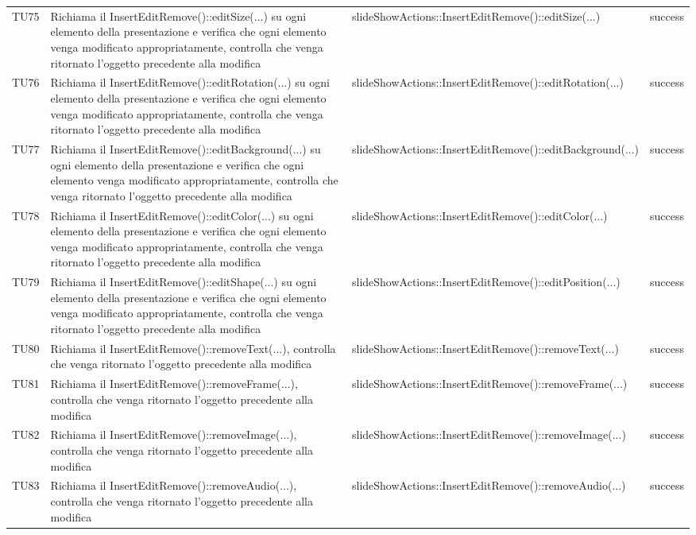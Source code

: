 \begin{longtable} [c]{| p{2cm} | p{6cm} |p{3cm} | p{2cm} |}
		 		 TU75 & Richiama il InsertEditRemove()::editSize(...) su ogni elemento della presentazione e verifica che ogni elemento venga modificato appropriatamente, controlla che venga ritornato l'oggetto precedente alla modifica   & slideShowActions::InsertEditRemove()::editSize(...) & success \\
		 		 TU76 & Richiama il InsertEditRemove()::editRotation(...) su ogni elemento della presentazione e verifica che ogni elemento venga modificato appropriatamente, controlla che venga ritornato l'oggetto precedente alla modifica   & slideShowActions::InsertEditRemove()::editRotation(...) & success \\
		 		 TU77 & Richiama il InsertEditRemove()::editBackground(...) su ogni elemento della presentazione e verifica che ogni elemento venga modificato appropriatamente, controlla che venga ritornato l'oggetto precedente alla modifica   & slideShowActions::InsertEditRemove()::editBackground(...) & success \\
		 		 TU78 & Richiama il InsertEditRemove()::editColor(...) su ogni elemento della presentazione e verifica che ogni elemento venga modificato appropriatamente, controlla che venga ritornato l'oggetto precedente alla modifica   & slideShowActions::InsertEditRemove()::editColor(...) & success \\
		 		 TU79 & Richiama il InsertEditRemove()::editShape(...) su ogni elemento della presentazione e verifica che ogni elemento venga modificato appropriatamente, controlla che venga ritornato l'oggetto precedente alla modifica   & slideShowActions::InsertEditRemove()::editPosition(...) & success \\
		 		 TU80 & Richiama il InsertEditRemove()::removeText(...), controlla che venga ritornato l'oggetto precedente alla modifica & slideShowActions::InsertEditRemove()::removeText(...) & success \\
		 		 TU81 & Richiama il InsertEditRemove()::removeFrame(...), controlla che venga ritornato l'oggetto precedente alla modifica & slideShowActions::InsertEditRemove()::removeFrame(...) & success \\
		 		 TU82 & Richiama il InsertEditRemove()::removeImage(...), controlla che venga ritornato l'oggetto precedente alla modifica & slideShowActions::InsertEditRemove()::removeImage(...) & success \\
		 		 TU83 & Richiama il InsertEditRemove()::removeAudio(...), controlla che venga ritornato l'oggetto precedente alla modifica & slideShowActions::InsertEditRemove()::removeAudio(...) & success \\

\end{longtable}

